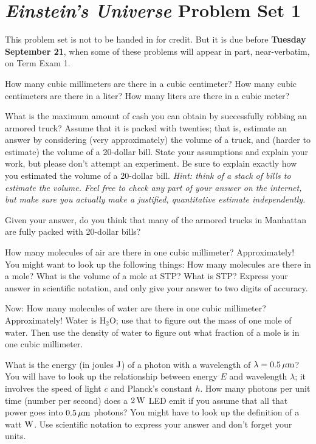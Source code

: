 \documentclass[12pt, letterpaper]{article}
\begin{document}
\section*{\textsl{Einstein's Universe} Problem Set 1}

This problem set is not to be handed in for credit. But it is due
before \textbf{Tuesday September 21}, when some of these problems
will appear in part, near-verbatim, on Term Exam 1.

\begin{problem}
How many cubic millimeters are there in a cubic centimeter? How many
cubic centimeters are there in a liter? How many liters are there in a
cubic meter?
\end{problem}

\begin{problem}
What is the maximum amount of cash you can obtain by
successfully robbing an armored truck?  Assume that it is packed with
twenties; that is, estimate an answer by considering (very approximately) the volume of a
truck, and (harder to estimate) the volume of a 20-dollar bill.  State
your assumptions and explain your work, but please don't attempt an
experiment.  Be sure to explain exactly how you estimated the volume
of a 20-dollar bill.  \emph{Hint: think of a stack of bills to
  estimate the volume.  Feel free to \emph{check} any part of your
  answer on the internet, but make sure you actually make a justified,
  quantitative estimate independently.}

Given your answer, do you think that many of the armored trucks in Manhattan
are fully packed with 20-dollar bills?
\end{problem}

\begin{problem}
How many molecules of air are there in one cubic millimeter?
Approximately! You might want to look up the following things: How
many molecules are there in a mole? What is the volume of a mole at
STP? What is STP? Express your answer in scientific notation, and only
give your answer to two digits of accuracy.

Now: How many molecules of water are there in one cubic millimeter?
Approximately! Water is $\mathrm{H}_2\mathrm{O}$; use that to figure
out the mass of one mole of water. Then use the density of water to
figure out what fraction of a mole is in one cubic millimeter.
\end{problem}

\begin{problem}
What is the energy (in joules $\mathrm{J}$) of a photon with a wavelength of
$\lambda = 0.5\,\mathrm{\mu m}$? You will have to look up the relationship
between energy $E$ and wavelength $\lambda$; it involves the speed of
light $c$ and Planck's constant $h$. How many photons per unit time
(number per second) does a $2\,\mathrm{W}$ LED emit if you assume that all
that power goes into $0.5\,\mathrm{\mu m}$ photons? You might have to look up
the definition of a watt $\mathrm{W}$. Use scientific notation to express your
answer and don't forget your units.
\end{problem}
\end{document}
